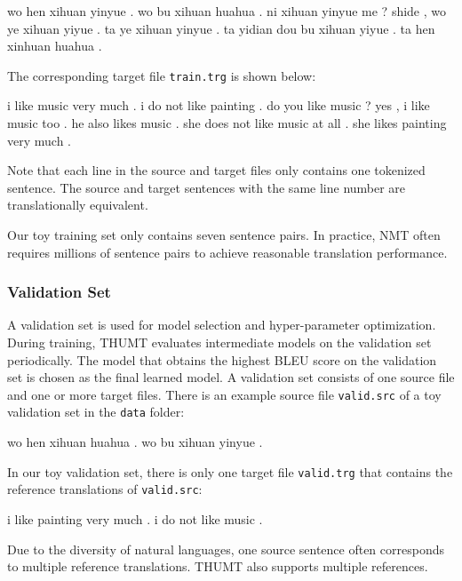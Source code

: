 \documentclass{article}
\begin{document}
\begin{everbatim}
wo hen xihuan yinyue .
wo bu xihuan huahua .
ni xihuan yinyue me ?
shide , wo ye xihuan yiyue .
ta ye xihuan yinyue .
ta yidian dou bu xihuan yiyue .
ta hen xinhuan huahua .
\end{everbatim}

The corresponding target file \verb|train.trg| is shown below:
\begin{everbatim}
i like music very much .
i do not like painting .
do you like music ?
yes , i like music too .
he also likes music .
she does not like music at all .
she likes painting very much .
\end{everbatim}

Note that each line in the source and target files only contains one tokenized sentence. The source and target sentences with the same line number are translationally equivalent.

Our toy training set only contains seven sentence pairs. In practice, NMT often requires millions of sentence pairs to achieve reasonable translation performance.

\subsubsection{Validation Set}

A validation set is used for model selection and hyper-parameter optimization. During training, THUMT evaluates intermediate models on the validation set periodically. The model that obtains the highest BLEU score on the validation set is chosen as the final learned model.
A validation set consists of one source file and one or more target files. There is an example source file \verb|valid.src| of a toy validation set in the \verb|data| folder:

\begin{everbatim}
wo hen xihuan huahua .
wo bu xihuan yinyue .
\end{everbatim}

In our toy validation set, there is only one target file \verb|valid.trg| that contains the reference translations of \verb|valid.src|:
\begin{everbatim}
i like painting very much .
i do not like music .
\end{everbatim}

Due to the diversity of natural languages, one source sentence often corresponds to multiple reference translations. THUMT also supports multiple references.
\end{document}
